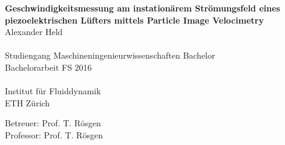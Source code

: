 \documentclass[smallheadings,headsepline,11pt,oneside,a4paper]{scrbook}
\begin{document}
\frontmatter							%


\begin{titlepage}
\begin{center}
    \vspace*{1cm}
    {\huge \bfseries  Geschwindigkeitsmessung am instationärem Strömungsfeld eines piezoelektrischen Lüfters mittels Particle Image Velocimetry\\ }
    \vspace{2cm}
    {\large 
	Alexander Held\\
	~\\
	Studiengang Maschineningenieurwissenschaften Bachelor\\
	\vspace{3.5cm}
	Bachelorarbeit FS 2016\\
	~\\
	Institut für Fluiddynamik\\
	ETH Zürich\\
    }




{\large
	Betreuer: Prof. T. Rösgen\\[\baselineskip]
	Professor: Prof. T. Rösgen
}
\end{center}

\vspace*{2cm} %

\end{titlepage}



\begin{titlepage}
\thispagestyle{empty}
\newpage
\mbox{}
\end{titlepage}







\tableofcontents
\end{document}

